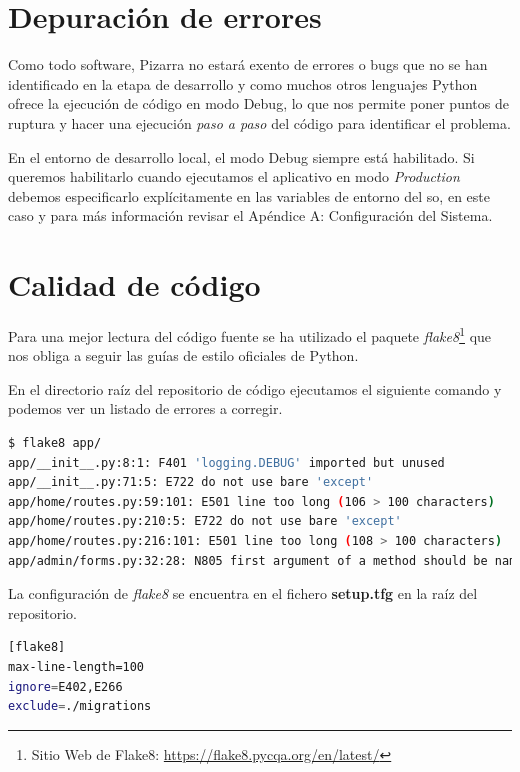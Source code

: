 \documentclass[11pt,spanish,listoffigures,listoftables]{tfgetsinf}
\begin{document}
\section{Depuración de errores}

Como todo software, Pizarra no estará exento de errores o \foreignlanguage{english}{bugs} que no se han identificado en la etapa de desarrollo y como muchos otros lenguajes Python ofrece la ejecución de código en modo Debug, lo que nos permite poner puntos de ruptura y hacer una ejecución \textit{paso a paso} del código para identificar el problema.

En el entorno de desarrollo local, el modo Debug siempre está habilitado. Si queremos habilitarlo cuando ejecutamos el aplicativo en modo \textit{Production} debemos especificarlo explícitamente en las variables de entorno del \acrshort{so}, en este caso y para más información revisar el Apéndice A: Configuración del Sistema.

\section{Calidad de código}

Para una mejor lectura del código fuente se ha utilizado el \Gls{paquete} \textit{flake8}\footnote{Sitio Web de Flake8: \url{https://flake8.pycqa.org/en/latest/}} que nos obliga a seguir las guías de estilo oficiales de Python.

En el directorio raíz del repositorio de código ejecutamos el siguiente comando y podemos ver un listado de errores a corregir.

\begin{lstlisting}[language=bash]
$ flake8 app/
app/__init__.py:8:1: F401 'logging.DEBUG' imported but unused
app/__init__.py:71:5: E722 do not use bare 'except'
app/home/routes.py:59:101: E501 line too long (106 > 100 characters)
app/home/routes.py:210:5: E722 do not use bare 'except'
app/home/routes.py:216:101: E501 line too long (108 > 100 characters)
app/admin/forms.py:32:28: N805 first argument of a method should be named 'self'
\end{lstlisting}

La configuración de \textit{flake8} se encuentra en el fichero \textbf{setup.tfg} en la raíz del repositorio.

\begin{lstlisting}[language=bash]
[flake8]
max-line-length=100
ignore=E402,E266
exclude=./migrations
\end{lstlisting}
\end{document}
